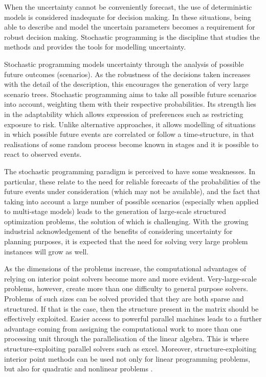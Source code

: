 
When the uncertainty cannot be conveniently forecast, the use of 
deterministic models is considered inadequate for decision making. In 
these situations, being able to describe and model the uncertain parameters
becomes a requirement for robust decision making. Stochastic 
programming is the discipline that 
studies the methods and provides the tools for modelling uncertainty.

Stochastic programming models uncertainty through the analysis 
of possible future outcomes (scenarios). 
As the robustness of the decisions taken increases with the detail of the 
description, this encourages the generation of very large scenario trees.
Stochastic programming aims to take all possible future scenarios 
into account, weighting them
with their respective probabilities. Its strength lies in the
adaptability which allows expression of preferences such as restricting
exposure to risk. Unlike alternative approaches, it allows modelling of
situations in which possible future events are correlated or follow a
time-structure, in that realisations of some random process
become known in stages and it is
possible to react to observed events.

The stochastic programming paradigm is perceived to have
some weaknesses.
In particular, these relate to the need for reliable forecasts
of the probabilities of the future events under consideration
(which may not be available), and the fact that 
taking into account a large number of possible scenarios 
(especially when applied to multi-stage models) leads to
the generation of large-scale structured optimization problems,
the solution of which is challenging. 
With the growing industrial acknowledgement of the benefits of 
considering uncertainty for planning purposes, it is expected that the 
need for solving very large problem instances will grow as well.

As the dimensions of the problems increase, the computational advantages 
of relying on interior point solvers become more and more evident. 
Very-large-scale problems, however, create more than one difficulty to general 
purpose solvers.
Problems of such sizes can be solved provided that they are both sparse
and structured. If that is the case, then the structure present 
in the matrix should be effectively exploited.
Easier access to powerful parallel machines leads to a 
further advantage coming from assigning the computational work 
to more than one processing unit through the parallelisation of 
the linear algebra.
This is where structure-exploiting parallel solvers such as \OOPS 
\cite{GondzioSarkissian} excel. Moreover, structure-exploiting interior 
point methods can be used not only for linear programming problems, 
but also for quadratic and nonlinear problems \cite{GondzioGrothey07}.

